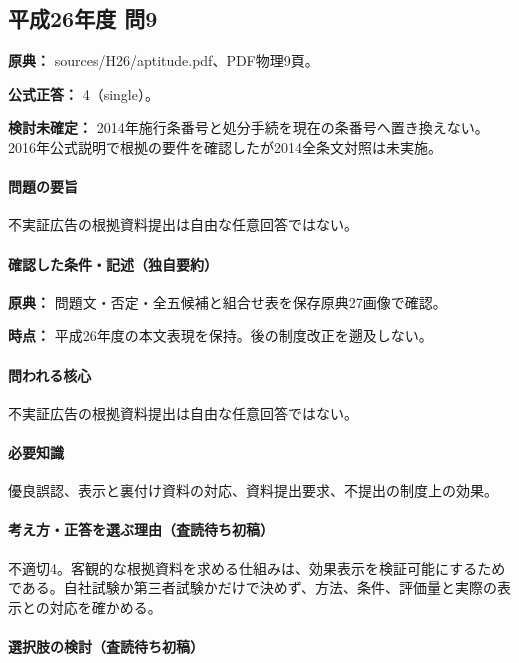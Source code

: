\subsection{平成26年度 問9}
\label{q:h26-reg-apt-09}

\noindent\textbf{原典：} sources/H26/aptitude.pdf、PDF物理9頁。

\textbf{公式正答：} 4（single）。

\par\textbf{検討未確定：} 2014年施行条番号と処分手続を現在の条番号へ置き換えない。2016年公式説明で根拠の要件を確認したが2014全条文対照は未実施。

\paragraph{問題の要旨} 不実証広告の根拠資料提出は自由な任意回答ではない。

\paragraph{確認した条件・記述（独自要約）}\mbox{}\par

\noindent\textbf{原典：} 問題文・否定・全五候補と組合せ表を保存原典27画像で確認。\par

\noindent\textbf{時点：} 平成26年度の本文表現を保持。後の制度改正を遡及しない。\par

\paragraph{問われる核心} 不実証広告の根拠資料提出は自由な任意回答ではない。

\paragraph{必要知識} 優良誤認、表示と裏付け資料の対応、資料提出要求、不提出の制度上の効果。

\paragraph{考え方・正答を選ぶ理由（査読待ち初稿）} 不適切4。客観的な根拠資料を求める仕組みは、効果表示を検証可能にするためである。自社試験か第三者試験かだけで決めず、方法、条件、評価量と実際の表示との対応を確かめる。

\paragraph{選択肢の検討（査読待ち初稿）}\mbox{}\par

